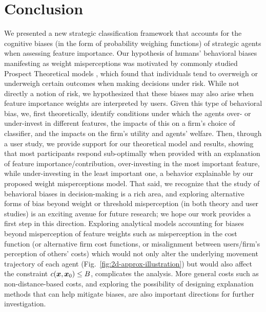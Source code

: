 \section{Conclusion}\label{sec:conclusion}
We presented a new strategic classification framework that accounts for the cognitive biases (in the form of probability weighing functions) of strategic agents when assessing feature importance. 
{Our hypothesis of humans' behavioral biases manifesting as weight misperceptions was motivated by commonly studied Prospect Theoretical models \cite{kahnemann1979prospect}, which found that individuals tend to overweigh or underweigh certain outcomes when making decisions under risk. While not directly a notion of risk, we hypothesized that these biases may also arise when feature importance weights are interpreted by users.}
{Given this type of behavioral bias,} we{, first theoretically, } identify conditions under which the agents over- or under-invest in different features, the impacts of this on a firm's choice of classifier, and the impacts on the firm's utility and agents' welfare. Then, through a user study, we provide support for our theoretical model and results, showing that most participants respond sub-optimally when provided with an explanation of feature importance/contribution, over-investing in the most important feature, while under-investing in the least important one, {a behavior explainable by our proposed weight misperceptions model}. {That said, we recognize that the study of behavioral biases in decision-making is a rich area, and exploring alternative forms of bias beyond weight or threshold misperception (in both theory and user studies) is an exciting avenue for future research; we hope our work provides a first step in this direction.}
Exploring analytical models accounting for biases beyond misperception of feature weights {such as misperception in the cost function (or alternative firm cost functions, or misalignment between users/firm's perception of others' costs) which would not only alter the underlying movement trajectory of each agent (Fig.~\ref{fig:2d-approx-illustration}) but would also affect the constraint $c({\bm{x}},{\bm{x}}_0)\le B$, complicates the analysis. More general costs such as non-distance-based costs}, and exploring the possibility of designing explanation methods that can help mitigate biases, are also important directions for further investigation. 

